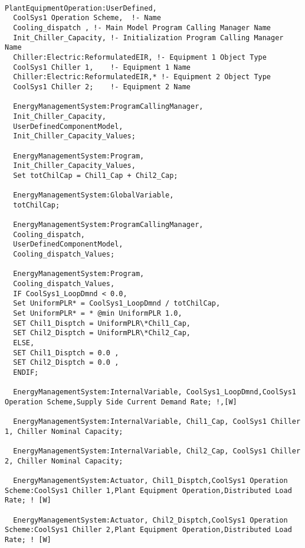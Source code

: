 \begin{lstlisting}

PlantEquipmentOperation:UserDefined,
  CoolSys1 Operation Scheme,  !- Name
  Cooling_dispatch , !- Main Model Program Calling Manager Name
  Init_Chiller_Capacity, !- Initialization Program Calling Manager Name
  Chiller:Electric:ReformulatedEIR, !- Equipment 1 Object Type
  CoolSys1 Chiller 1,    !- Equipment 1 Name
  Chiller:Electric:ReformulatedEIR,* !- Equipment 2 Object Type
  CoolSys1 Chiller 2;    !- Equipment 2 Name

  EnergyManagementSystem:ProgramCallingManager,
  Init_Chiller_Capacity,
  UserDefinedComponentModel,
  Init_Chiller_Capacity_Values;

  EnergyManagementSystem:Program,
  Init_Chiller_Capacity_Values,
  Set totChilCap = Chil1_Cap + Chil2_Cap;

  EnergyManagementSystem:GlobalVariable,
  totChilCap;

  EnergyManagementSystem:ProgramCallingManager,
  Cooling_dispatch,
  UserDefinedComponentModel,
  Cooling_dispatch_Values;

  EnergyManagementSystem:Program,
  Cooling_dispatch_Values,
  IF CoolSys1_LoopDmnd < 0.0,
  Set UniformPLR* = CoolSys1_LoopDmnd / totChilCap,
  Set UniformPLR* = * @min UniformPLR 1.0,
  SET Chil1_Disptch = UniformPLR\*Chil1_Cap,
  SET Chil2_Disptch = UniformPLR\*Chil2_Cap,
  ELSE,
  SET Chil1_Disptch = 0.0 ,
  SET Chil2_Disptch = 0.0 ,
  ENDIF;

  EnergyManagementSystem:InternalVariable, CoolSys1_LoopDmnd,CoolSys1 Operation Scheme,Supply Side Current Demand Rate; !,[W]

  EnergyManagementSystem:InternalVariable, Chil1_Cap, CoolSys1 Chiller 1, Chiller Nominal Capacity;

  EnergyManagementSystem:InternalVariable, Chil2_Cap, CoolSys1 Chiller 2, Chiller Nominal Capacity;

  EnergyManagementSystem:Actuator, Chil1_Disptch,CoolSys1 Operation Scheme:CoolSys1 Chiller 1,Plant Equipment Operation,Distributed Load Rate; ! [W]

  EnergyManagementSystem:Actuator, Chil2_Disptch,CoolSys1 Operation Scheme:CoolSys1 Chiller 2,Plant Equipment Operation,Distributed Load Rate; ! [W]
\end{lstlisting}
